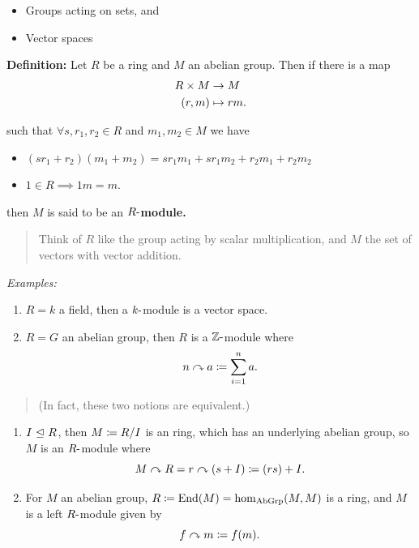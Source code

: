 \begin{itemize}
\item
  Groups acting on sets, and
\item
  Vector spaces
\end{itemize}

\textbf{Definition:} Let \(R\) be a ring and \(M\) an abelian group.
Then if there is a map \begin{align*}
R\times M &\to M \\
(r,m) &\mapsto rm
.\end{align*}

such that \(\forall s,r_1,r_2 \in R\) and \(m_1,m_2 \in M\) we have

\begin{itemize}
\tightlist
\item
  \((sr_1 + r_2)(m_1 + m_2) = sr_1m_1 + sr_1m_2 + r_2m_1 + r_2 m_2\)
\item
  \(1\in R \implies 1m = m\).
\end{itemize}

then \(M\) is said to be an \textbf{\(R{\hbox{-}}\)module.}

\begin{quote}
Think of \(R\) like the group acting by scalar multiplication, and \(M\)
the set of vectors with vector addition.
\end{quote}

\emph{Examples:}

\begin{enumerate}
\def\labelenumi{\arabic{enumi}.}
\item
  \(R = k\) a field, then a \(k{\hbox{-}}\)module is a vector space.
\item
  \(R = G\) an abelian group, then \(R\) is a \({\mathbb{Z}}{\hbox{-}}\)module where
  \[
  n\curvearrowright a \coloneqq \sum_{i=1}^n a
  .\]
\end{enumerate}

\begin{quote}
(In fact, these two notions are equivalent.)
\end{quote}

\begin{enumerate}
\def\labelenumi{\arabic{enumi}.}
\setcounter{enumi}{2}
\item
  \(I {~\trianglelefteq~} R\), then \(M \coloneqq R/I\) is an ring, which has an
  underlying abelian group, so \(M\) is an \(R{\hbox{-}}\)module where \[
  M\curvearrowright R = r\curvearrowright(s+I) \coloneqq (rs) + I
  .\]
\item
  For \(M\) an abelian group,
  \(R \coloneqq \mathrm{End}(M) = \hom_{\text{AbGrp}}(M, M)\) is a
  ring, and \(M\) is a left \(R{\hbox{-}}\)module given by \[
  f\curvearrowright m \coloneqq f(m)
  .\]
\end{enumerate}

